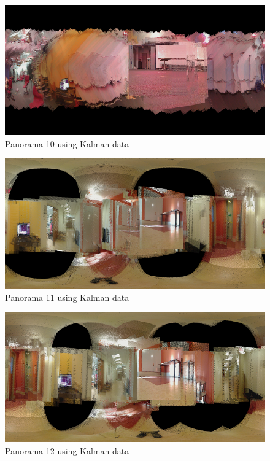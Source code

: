 \documentclass[a4paper]{article}
\begin{document}
\begin{figure}[h]
  \centering
    \includegraphics[width=1\textwidth]{pan_testset10_kalman_small.png}
  \caption{Panorama 10 using Kalman data\label{fig:panorama10_kalman}}
\end{figure}

\begin{figure}[h]
  \centering
    \includegraphics[width=1\textwidth]{pan_testset11_kalman_small.png}
  \caption{Panorama 11 using Kalman data\label{fig:panorama11_kalman}}
\end{figure}

\begin{figure}[h]
  \centering
    \includegraphics[width=1\textwidth]{pan_testset12_kalman_small.png}
  \caption{Panorama 12 using Kalman data\label{fig:panorama12_kalman}}
\end{figure}
\end{document}
